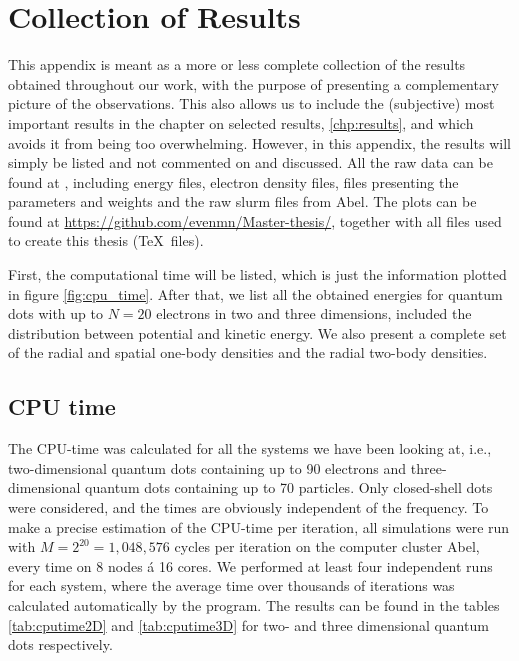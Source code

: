 \chapter{Collection of Results} \label{chp:totalresults}
This appendix is meant as a more or less complete collection of the results obtained throughout our work, with the purpose of presenting a complementary picture of the observations. This also allows us to include the (subjective) most important results in the chapter on selected results, \ref{chp:results}, and which avoids it from being too overwhelming. However, in this appendix, the results will simply be listed and not commented on and discussed. All the raw data can be found at \cite{nordhagen_even_marius_2019_3477946}, including energy files, electron density files, files presenting the parameters and weights and the raw slurm files from Abel. The plots can be found at \url{https://github.com/evenmn/Master-thesis/}, together with all files used to create this thesis (\TeX\, files).

First, the computational time will be listed, which is just the information plotted in figure \eqref{fig:cpu_time}. After that, we list all the obtained energies for quantum dots with up to $N=20$ electrons in two and three dimensions, included the distribution between potential and kinetic energy. We also present a complete set of the radial and spatial one-body densities and the radial two-body densities. 

\newpage
\section{CPU time} \label{sec:cputime}
The CPU-time was calculated for all the systems we have been looking at, i.e., two-dimensional quantum dots containing up to 90 electrons and three-dimensional quantum dots containing up to 70 particles. Only closed-shell dots were considered, and the times are obviously independent of the frequency. To make a precise estimation of the CPU-time per iteration, all simulations were run with $M=2^{20}=1,048,576$ cycles per iteration on the computer cluster Abel, every time on 8 nodes á 16 cores. We performed at least four independent runs for each system, where the average time over thousands of iterations was calculated automatically by the program. The results can be found in the tables \eqref{tab:cputime2D} and \eqref{tab:cputime3D} for two- and three dimensional quantum dots respectively. 

